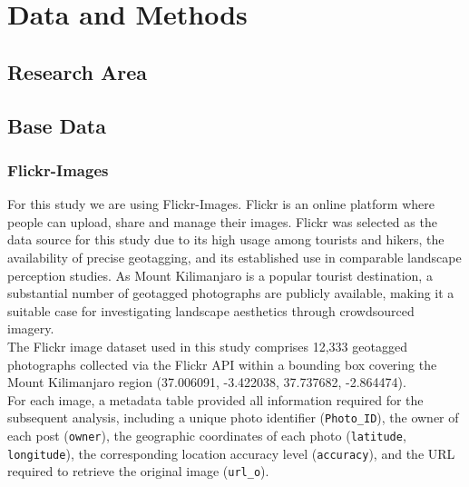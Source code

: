 \documentclass[hidelinks, 11pt]{article}
\begin{document}
\section{Data and Methods}\label{sec:Data and Methods}
\subsection{Research Area}

\subsection{Base Data}
\subsubsection{Flickr-Images}
For this study we are using Flickr-Images. Flickr is an online platform where people can upload, share and manage their images. Flickr was selected as the data source for this study due to its high usage among tourists and hikers, the availability of precise geotagging, and its established use in comparable landscape perception studies. As Mount Kilimanjaro is a popular tourist destination, a substantial number of geotagged photographs are publicly available, making it a suitable case for investigating landscape aesthetics through crowdsourced imagery.
\\
The Flickr image dataset used in this study comprises 12{,}333 geotagged photographs collected via the Flickr API within a bounding box covering the Mount Kilimanjaro region (37.006091, -3.422038, 37.737682, -2.864474).
\\
For each image, a metadata table provided all information required for the subsequent analysis, including a unique photo identifier (\texttt{Photo\_ID}), the owner of each post (\texttt{owner}), the geographic coordinates of each 
photo (\texttt{latitude}, \texttt{longitude}), the corresponding location accuracy level (\texttt{accuracy}), and the URL required to retrieve the original image (\texttt{url\_o}).
\end{document}
